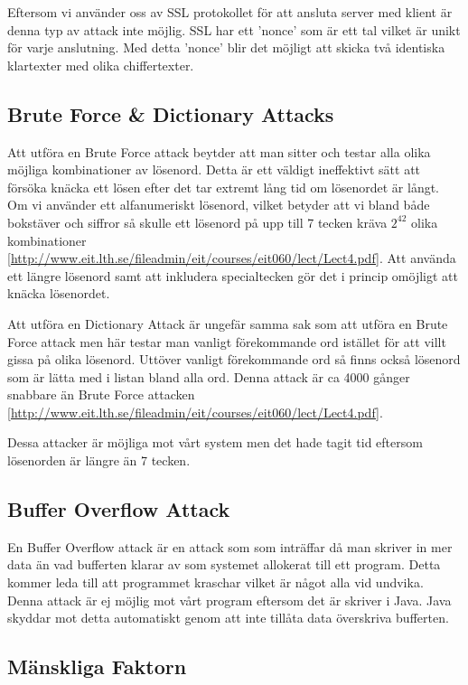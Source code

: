 Eftersom vi använder oss av SSL protokollet för att ansluta server med klient är denna typ av attack inte möjlig. SSL har ett 'nonce' som är ett tal vilket är unikt för varje anslutning. Med detta 'nonce' blir det möjligt att skicka två identiska klartexter med olika chiffertexter. 

\subsection{Brute Force \& Dictionary Attacks}

Att utföra en Brute Force attack beytder att man sitter och testar alla olika möjliga kombinationer av lösenord. Detta är ett väldigt ineffektivt sätt att försöka knäcka ett lösen efter det tar extremt lång tid om lösenordet är långt. Om vi använder ett alfanumeriskt lösenord, vilket betyder att vi bland både bokstäver och siffror så skulle ett lösenord på upp till 7 tecken kräva \begin{math}2^{42} \end{math} olika kombinationer [\url{http://www.eit.lth.se/fileadmin/eit/courses/eit060/lect/Lect4.pdf}]. Att använda ett längre lösenord samt att inkludera specialtecken gör det i princip omöjligt att knäcka lösenordet.

Att utföra en Dictionary Attack är ungefär samma sak som att utföra en Brute Force attack men här testar man vanligt förekommande ord istället för att villt gissa på olika lösenord. Uttöver vanligt förekommande ord så finns också lösenord som är lätta med i listan bland alla ord. Denna attack är ca 4000 gånger snabbare än Brute Force attacken [\url{http://www.eit.lth.se/fileadmin/eit/courses/eit060/lect/Lect4.pdf}]. 

Dessa attacker är möjliga mot vårt system men det hade tagit tid eftersom lösenorden är längre än 7 tecken.

\subsection{Buffer Overflow Attack}

En Buffer Overflow attack är en attack som som inträffar då man skriver in mer data än vad bufferten klarar av som systemet allokerat till ett program. Detta kommer leda till att programmet kraschar vilket är något alla vid undvika. Denna attack är ej möjlig mot vårt program eftersom det är skriver i Java. Java skyddar mot detta automatiskt genom att inte tillåta data överskriva bufferten.

\subsection{Mänskliga Faktorn}

